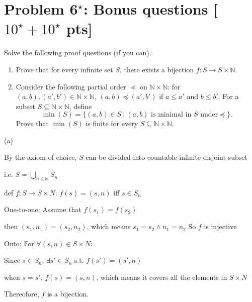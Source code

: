 \documentclass[11pt,twoside]{article}
\newcommand{\problem}[1]{\section*{Problem #1}}
\begin{document}
\problem{6$^\star$: Bonus questions [$10^\star+10^\star$ pts]}

Solve the following proof questions (if you can).

\begin{enumerate}
    \item Prove that for every infinite set $S$, there exists a bijection $f: S \rightarrow S \times \mathbb{N}$.
    \item Consider the following partial order $\preceq$ on $\mathbb{N} \times \mathbb{N}$: for $(a,b),(a',b') \in \mathbb{N} \times \mathbb{N}$, $(a,b) \preceq (a',b')$ if $a \leq a'$ and $b \leq b'$.
    For a subset $S \subseteq \mathbb{N} \times \mathbb{N}$, define 
    \begin{equation*}
        \min(S) = \{(a,b) \in S\ |\ (a,b) \text{ is minimal in } S \text{ under} \preceq\}.
    \end{equation*}
    Prove that $\min(S)$ is finite for every $S \subseteq \mathbb{N} \times \mathbb{N}$.
\end{enumerate}

\hspace*{\fill}

(a)


By the axiom of choice, $S$ can be divided into countable infinite disjoint subset

i.e. $S = \bigcup_{n \in \mathbb{N}} S_n$

def $f: S \rightarrow S \times N$: $f(s) = (s,n)$ iff $s\in S_n$

One-to-one: Assume that  $f(s_1) = f(s_2)$

then $(s_1, n_1)= (s_2, n_2)$, which means $s_1 = s_2 \land n_1 = n_2$
So $f$ is injective

Onto: For $\forall (s,n) \in S \times N$:

Since $s \in S_n$, $\exists s' \in S_n$ s.t. $f(s')= (s',n)$

when $ s = s'$, $f(s) = (s,n)$, which means it covers all the elements in $S \times N$

Thereofore, $f$ is a bijection.
\end{document}
